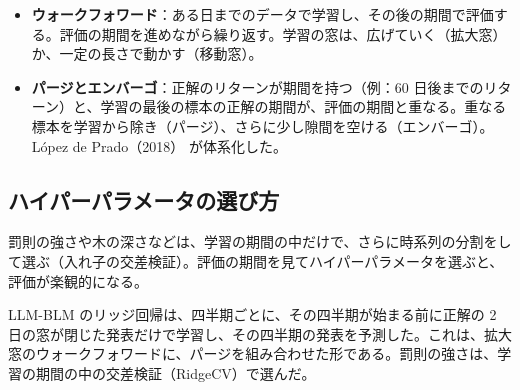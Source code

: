 \begin{itemize}
\item \textbf{ウォークフォワード}：ある日までのデータで学習し、その後の期間で評価する。評価の期間を進めながら繰り返す。学習の窓は、広げていく（拡大窓）か、一定の長さで動かす（移動窓）。
\item \textbf{パージとエンバーゴ}：正解のリターンが期間を持つ（例：60 日後までのリターン）と、学習の最後の標本の正解の期間が、評価の期間と重なる。重なる標本を学習から除き（パージ）、さらに少し隙間を空ける（エンバーゴ）。López de Prado（2018）\cite{lopezdeprado2018} が体系化した。
\end{itemize}

\subsection{ハイパーパラメータの選び方}

罰則の強さや木の深さなどは、学習の期間の中だけで、さらに時系列の分割をして選ぶ（入れ子の交差検証）。評価の期間を見てハイパーパラメータを選ぶと、評価が楽観的になる。

\begin{projbox}
LLM-BLM のリッジ回帰は、四半期ごとに、その四半期が始まる前に正解の 2 日の窓が閉じた発表だけで学習し、その四半期の発表を予測した。これは、拡大窓のウォークフォワードに、パージを組み合わせた形である。罰則の強さは、学習の期間の中の交差検証（RidgeCV）で選んだ。
\end{projbox}
